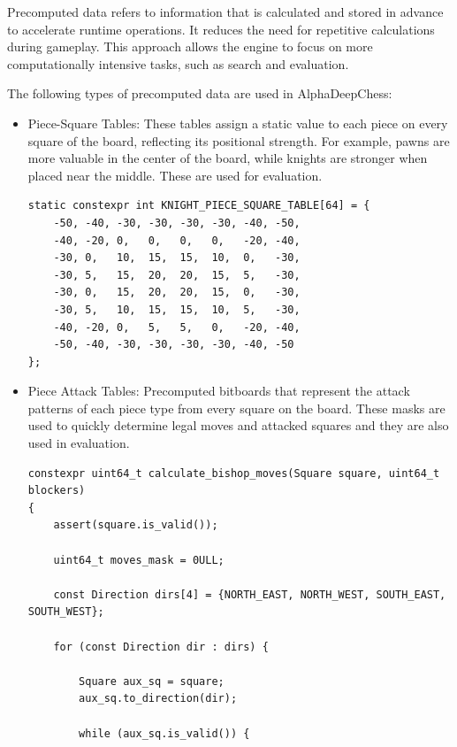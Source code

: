 Precomputed data refers to information that is calculated and stored in advance to accelerate runtime operations. It reduces the need for repetitive calculations during gameplay. This approach allows the engine to focus on more computationally intensive tasks, such as search and evaluation.

The following types of precomputed data are used in AlphaDeepChess:

\begin{itemize}
    \item Piece-Square Tables: These tables assign a static value to each piece on every square of the board, reflecting its positional strength. For example, pawns are more valuable in the center of the board, while knights are stronger when placed near the middle. These are used for evaluation.
    
\begin{lstlisting}[breaklines=true, frame=single, caption={Initialization of knight piece-square table}]
static constexpr int KNIGHT_PIECE_SQUARE_TABLE[64] = {
    -50, -40, -30, -30, -30, -30, -40, -50,
    -40, -20, 0,   0,   0,   0,   -20, -40,
    -30, 0,   10,  15,  15,  10,  0,   -30,
    -30, 5,   15,  20,  20,  15,  5,   -30,
    -30, 0,   15,  20,  20,  15,  0,   -30,
    -30, 5,   10,  15,  15,  10,  5,   -30,
    -40, -20, 0,   5,   5,   0,   -20, -40,
    -50, -40, -30, -30, -30, -30, -40, -50
};
\end{lstlisting}
    
    \item Piece Attack Tables: Precomputed bitboards that represent the attack patterns of each piece type from every square on the board. These masks are used to quickly determine legal moves and attacked squares and they are also used in evaluation.
    
\begin{lstlisting}[breaklines=true, frame=single, caption={Initialization of bishop attack tables}]
constexpr uint64_t calculate_bishop_moves(Square square, uint64_t blockers)
{
    assert(square.is_valid());

    uint64_t moves_mask = 0ULL;

    const Direction dirs[4] = {NORTH_EAST, NORTH_WEST, SOUTH_EAST, SOUTH_WEST};

    for (const Direction dir : dirs) {

        Square aux_sq = square;
        aux_sq.to_direction(dir);

        while (aux_sq.is_valid()) {


\end{lstlisting}
\end{itemize}
